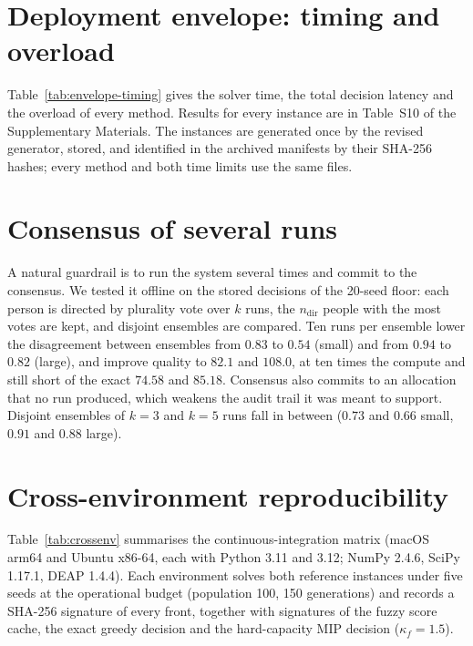 \documentclass[systems,article,submit,moreauthors,pdftex]{Definitions/mdpi}
\begin{document}
\section{Deployment envelope: timing and overload}\label{app:envelope}
Table~\ref{tab:envelope-timing} gives the solver time, the total decision latency and the overload
of every method. Results for every instance are in Table~S10 of the Supplementary Materials. The
instances are generated once by the revised generator, stored, and identified in the archived
manifests by their SHA-256 hashes; every method and both time limits use the same files.



\section{Consensus of several runs}\label{app:consensus}
A natural guardrail is to run the system several times and commit to the consensus. We
tested it offline on the stored decisions of the 20-seed floor: each person is directed by plurality vote over $k$ runs,
the $n_{\mathrm{dir}}$ people with the most votes are kept, and disjoint ensembles are
compared. Ten runs per ensemble lower the disagreement between ensembles from $0.83$ to $0.54$
(small) and from $0.94$ to $0.82$ (large), and improve quality to $82.1$ and $108.0$, at ten
times the compute and still short of the exact $74.58$ and $85.18$. Consensus also commits
to an allocation that no run produced, which weakens the audit trail it was meant to support. Disjoint ensembles of $k=3$ and $k=5$ runs fall in between
($0.73$ and $0.66$ small, $0.91$ and $0.88$ large).

\section{Cross-environment reproducibility}\label{app:crossenv}
Table~\ref{tab:crossenv} summarises the continuous-integration matrix (macOS arm64 and Ubuntu
x86-64, each with Python 3.11 and 3.12; NumPy 2.4.6, SciPy 1.17.1, DEAP 1.4.4). Each
environment solves both reference instances under five seeds at the operational budget
(population 100, 150 generations) and records a SHA-256 signature of every front, together
with signatures of the fuzzy score cache, the exact greedy decision and the hard-capacity MIP
decision ($\kappa_f = 1.5$).
\end{document}
